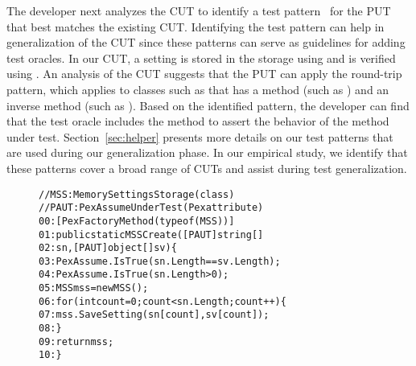 The developer next analyzes the CUT to identify a test pattern~\cite{PEXDOC} for the PUT that best matches the existing CUT. Identifying the test pattern can help in generalization of the CUT since these patterns can serve as guidelines for adding test oracles. In our CUT, a setting is stored in the storage using  and is verified using . An analysis of the CUT suggests that the PUT can apply the round-trip pattern, which applies to classes such as  that has a method (such as ) and an inverse method (such as ). Based on the identified pattern, the developer can find that the test oracle  includes the  method to assert the behavior of the  method under test. Section~\ref{sec:helper} presents more details on our test patterns that are used during our generalization phase. In our empirical study, we identify that these patterns cover a broad range of CUTs and assist during test generalization.

\begin{figure}[t]
\begin{CodeOut}
\begin{alltt}
//MSS: MemorySettingsStorage (class)
//PAUT: PexAssumeUnderTest	(Pex attribute)
00:[PexFactoryMethod(typeof(MSS))]
01:public static MSS Create([PAUT]string[] 
02:\hspace*{0.3in}sn, [PAUT]object[] sv) \{
03:\hspace*{0.2in}PexAssume.IsTrue(sn.Length == sv.Length);
04:\hspace*{0.2in}PexAssume.IsTrue(sn.Length > 0);
05:\hspace*{0.2in}MSS mss = new MSS();
06:\hspace*{0.2in}for (int count = 0; count < sn.Length; count++) \{
07:\hspace*{0.3in}mss.SaveSetting(sn[count], sv[count]);
08:\hspace*{0.2in}\}
09:\hspace*{0.2in}return mss;
10:\}
\end{alltt}
\end{CodeOut}\vspace*{-4ex}
\vspace*{-4ex}
\end{figure}

